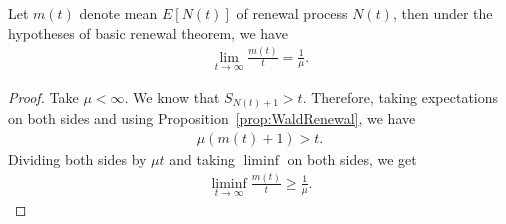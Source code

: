 \documentclass[a4paper,10pt, english]{article}
\begin{document}
\begin{thm} Let $m(t)$ denote mean $E[N(t)]$ of renewal process $N(t)$, then under the hypotheses of basic renewal theorem, we have 
\begin{align*}
\lim_{t \to \infty}\frac{m(t)}{t} = \frac{1}{\mu}.
\end{align*}
\end{thm}
\begin{proof}
Take $\mu < \infty$. We know that $S_{N(t)+1} > t$. Therefore, taking expectations on both sides and using Proposition~\ref{prop:WaldRenewal}, we have 
\begin{align*}
\mu (m(t) + 1) > t.
\end{align*}
Dividing both sides by $\mu t$ and taking $\liminf$ on both sides, we get
\begin{align}
\label{eq:LiminfMean}
	\liminf_{t \to \infty} \frac{m(t)}{t} \geq \frac{1}{\mu}.
\end{align}


\end{proof}
\end{document}
